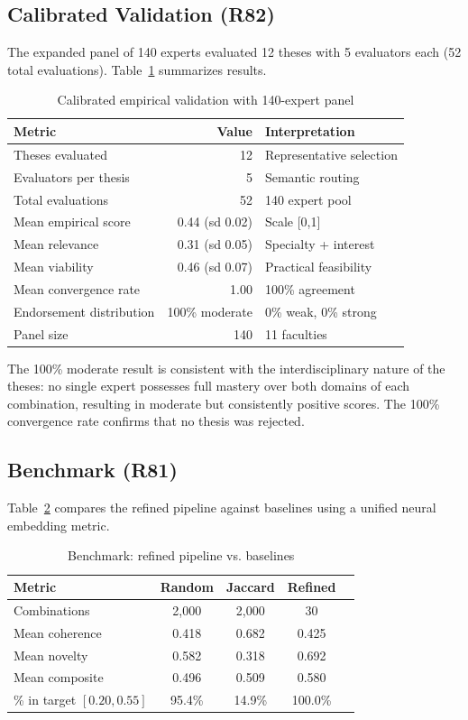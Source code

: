 \documentclass[a4paper,12pt]{article}
\begin{document}
\subsection{Calibrated Validation (R82)}

The expanded panel of 140 experts evaluated 12 theses with 5 evaluators each 
(52 total evaluations). Table~\ref{tab:validation} summarizes results.

\begin{table}[H]
\centering
\caption{Calibrated empirical validation with 140-expert panel}
\label{tab:validation}
\begin{tabular}{lrl}
\toprule
\textbf{Metric} & \textbf{Value} & \textbf{Interpretation} \\
\midrule
Theses evaluated & 12 & Representative selection \\
Evaluators per thesis & 5 & Semantic routing \\
Total evaluations & 52 & 140 expert pool \\
Mean empirical score & 0.44 (sd 0.02) & Scale [0,1] \\
Mean relevance & 0.31 (sd 0.05) & Specialty + interest \\
Mean viability & 0.46 (sd 0.07) & Practical feasibility \\
Mean convergence rate & 1.00 & 100\% agreement \\
Endorsement distribution & 100\% moderate & 0\% weak, 0\% strong \\
Panel size & 140 & 11 faculties \\
\bottomrule
\end{tabular}
\end{table}

The 100\% moderate result is consistent with the interdisciplinary nature of the theses: 
no single expert possesses full mastery over both domains of each combination, resulting 
in moderate but consistently positive scores. The 100\% convergence rate confirms that 
no thesis was rejected.

\subsection{Benchmark (R81)}

Table~\ref{tab:benchmark} compares the refined pipeline against baselines using 
a unified neural embedding metric.

\begin{table}[H]
\centering
\caption{Benchmark: refined pipeline vs. baselines}
\label{tab:benchmark}
\begin{tabular}{lcccc}
\toprule
\textbf{Metric} & \textbf{Random} & \textbf{Jaccard} & \textbf{Refined} \\
\midrule
Combinations & 2,000 & 2,000 & 30 \\
Mean coherence & 0.418 & 0.682 & 0.425 \\
Mean novelty & 0.582 & 0.318 & 0.692 \\
Mean composite & 0.496 & 0.509 & 0.580 \\
\% in target $[0.20,0.55]$ & 95.4\% & 14.9\% & 100.0\% \\
\bottomrule
\end{tabular}
\end{table}
\end{document}
